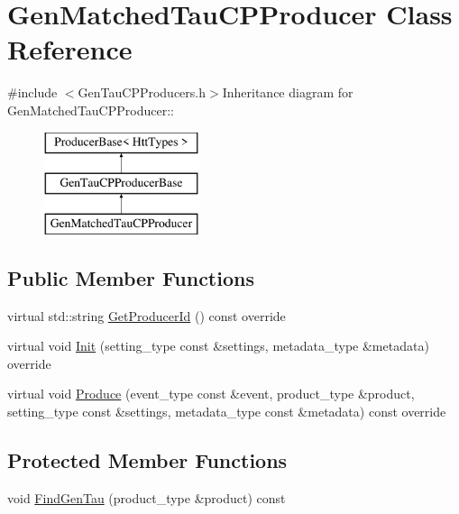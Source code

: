 \hypertarget{classGenMatchedTauCPProducer}{
\section{GenMatchedTauCPProducer Class Reference}
\label{classGenMatchedTauCPProducer}
}


{\ttfamily \#include $<$GenTauCPProducers.h$>$}Inheritance diagram for GenMatchedTauCPProducer::\begin{figure}[H]
\begin{center}
\leavevmode
\includegraphics[height=3cm]{classGenMatchedTauCPProducer}
\end{center}
\end{figure}
\subsection*{Public Member Functions}
\begin{DoxyCompactItemize}
\item 
virtual std::string \hyperlink{classGenMatchedTauCPProducer_ab061481ec0e31a5e9c37093521c5efbb}{GetProducerId} () const override
\item 
virtual void \hyperlink{classGenMatchedTauCPProducer_a408a6629682820189c1236cd6453374c}{Init} (setting\_\-type const \&settings, metadata\_\-type \&metadata) override
\item 
virtual void \hyperlink{classGenMatchedTauCPProducer_a82b615c1d349a3f1d65ede4379e18758}{Produce} (event\_\-type const \&event, product\_\-type \&product, setting\_\-type const \&settings, metadata\_\-type const \&metadata) const override
\end{DoxyCompactItemize}
\subsection*{Protected Member Functions}
\begin{DoxyCompactItemize}
\item 
void \hyperlink{classGenMatchedTauCPProducer_adaea763e2be4277c47ffc9685aac25bc}{FindGenTau} (product\_\-type \&product) const 
\end{DoxyCompactItemize}


